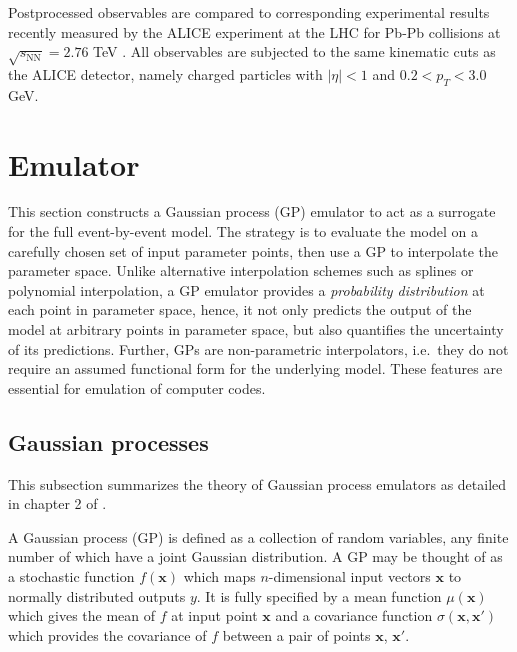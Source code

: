 \documentclass[aps,prc,reprint,superscriptaddress,amsmath]{revtex4-1}
\begin{document}
Postprocessed observables are compared to corresponding experimental results recently measured by the ALICE experiment at the LHC for Pb-Pb collisions at $\sqrt{s_\text{NN}} = 2.76$ TeV \cite{Abelev:2014mda}.
All observables are subjected to the same kinematic cuts as the ALICE detector, namely charged particles with $|\eta| < 1$ and $0.2 < p_T < 3.0$ GeV.


\section{Emulator}

This section constructs a Gaussian process (GP) emulator to act as a surrogate for the full event-by-event model.
The strategy is to evaluate the model on a carefully chosen set of input parameter points, then use a GP to interpolate the parameter space.
Unlike alternative interpolation schemes such as splines or polynomial interpolation, a GP emulator provides a \emph{probability distribution} at each point in parameter space, hence, it not only predicts the output of the model at arbitrary points in parameter space, but also quantifies the uncertainty of its predictions.
Further, GPs are non-parametric interpolators, i.e.\ they do not require an assumed functional form for the underlying model.
These features are essential for emulation of computer codes.

\subsection{Gaussian processes}

\newcommand{\x}{\mathbf x}
\newcommand{\y}{\mathbf y}
\newcommand{\zero}{\mathbf 0}
\newcommand{\muvec}{\boldsymbol\mu}
\newcommand{\N}{\mathcal N}

This subsection summarizes the theory of Gaussian process emulators as detailed in chapter 2 of \cite{Rasmussen:2006gp}.

A Gaussian process (GP) is defined as a collection of random variables, any finite number of which have a joint Gaussian distribution.
A GP may be thought of as a stochastic function $f(\x)$ which maps $n$-dimensional input vectors $\x$ to normally distributed outputs $y$.
It is fully specified by a mean function $\mu(\x)$ which gives the mean of $f$ at input point $\x$ and a covariance function $\sigma(\x, \x')$ which provides the covariance of $f$ between a pair of points $\x$, $\x'$.
\end{document}
